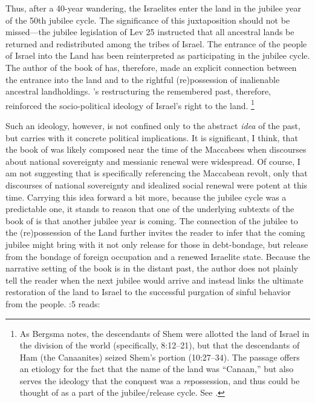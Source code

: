 \noindent
Thus, after a 40-year wandering, the Israelites enter the land in the jubilee year of the 50th jubilee cycle. The significance of this juxtaposition should not be missed---the jubilee legislation of Lev 25 instructed that all ancestral lands be returned and redistributed among the tribes of Israel. The entrance of the people of Israel into the Land has been reinterpreted as participating in the jubilee cycle. The author of the book of \jub has, therefore, made an explicit connection between the entrance into the land and to the rightful (re)possession of inalienable ancestral landholdings. \jub's restructuring the remembered past, therefore, reinforced the socio-political ideology of Israel's right to the land.%
    \footnote{As Bergsma notes, the descendants of Shem were allotted the land of Israel in the division of the world (specifically, 8:12--21), but that the descendants of Ham (the Canaanites) seized Shem's portion (10:27--34). The passage offers an etiology for the fact that the name of the land was ``Canaan,'' but also serves the ideology that the conquest was a \emph{re}possession, and thus could be thought of as a part of the jubilee/release cycle. See \cite[234--35]{bergsma2007}.}

Such an ideology, however, is not confined only to the abstract \emph{idea} of the past, but carries with it concrete political implications. It is significant, I think, that the book of \jub was likely composed near the time of the Maccabees when discourses about national sovereignty and messianic renewal were widespread. Of course, I am not suggesting that \jub is specifically referencing the Maccabean revolt, only that discourses of national sovereignty and idealized social renewal were potent at this time. Carrying this idea forward a bit more, because the jubilee cycle was a predictable one, it stands to reason that one of the underlying subtexts of the book of \jub is that another jubilee year is coming. The connection of the jubilee to the (re)possession of the Land further invites the reader to infer that the coming jubilee might bring with it not only release for those in debt-bondage, but release from the bondage of foreign occupation and a renewed Israelite state. Because the narrative setting of the book is in the distant past, the author does not plainly tell the reader when the next jubilee would arrive and instead links the ultimate restoration of the land to Israel to the successful purgation of sinful behavior from the people. :5 reads:

